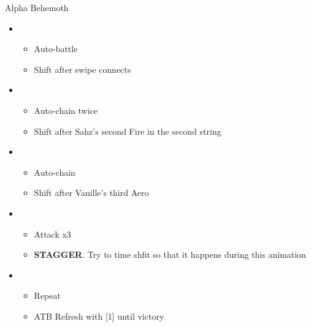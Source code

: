 \documentclass{report}
\begin{document}
\begin{battle}{Alpha Behemoth}
\begin{itemize}
    \item \first
    \begin{itemize}
        \item Auto-battle
        \item Shift after swipe connects
    \end{itemize}
    \item \third
    \begin{itemize}
        \item Auto-chain twice
        \item Shift after Sahz's second Fire in the second string
    \end{itemize}
    \item \fourth
    \begin{itemize}
        \item Auto-chain
        \item Shift after Vanille's third Aero
    \end{itemize}
    \item \first
    \begin{itemize}
        \item Attack x3
        \item \textbf{STAGGER}. Try to time shfit so that it happens during this animation
    \end{itemize}
    \item \fifth
    \begin{itemize}
        \item Repeat
        \item ATB Refresh with [1] until victory
    \end{itemize}
\end{itemize}
\end{battle}



 
\end{document}

